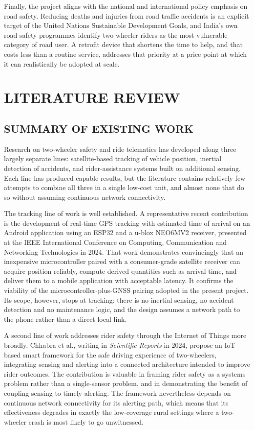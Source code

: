 \documentclass[12pt,a4paper,oneside]{report}
\begin{document}
Finally, the project aligns with the national and international policy emphasis on road
safety. Reducing deaths and injuries from road traffic accidents is an explicit target of
the United Nations Sustainable Development Goals, and India's own road-safety programmes
identify two-wheeler riders as the most vulnerable category of road user. A retrofit device
that shortens the time to help, and that costs less than a routine service, addresses that
priority at a price point at which it can realistically be adopted at scale.

\chapter{LITERATURE REVIEW}

\section{SUMMARY OF EXISTING WORK}

Research on two-wheeler safety and ride telematics has developed along three largely
separate lines: satellite-based tracking of vehicle position, inertial detection of
accidents, and rider-assistance systems built on additional sensing. Each line has produced
capable results, but the literature contains relatively few attempts to combine all three
in a single low-cost unit, and almost none that do so without assuming continuous network
connectivity.

The tracking line of work is well established. A representative recent contribution is the
development of real-time GPS tracking with estimated time of arrival on an Android
application using an ESP32 and a u-blox NEO6MV2 receiver, presented at the IEEE
International Conference on Computing, Communication and Networking Technologies in 2024.
That work demonstrates convincingly that an inexpensive microcontroller paired with a
consumer-grade satellite receiver can acquire position reliably, compute derived quantities
such as arrival time, and deliver them to a mobile application with acceptable latency. It
confirms the viability of the microcontroller-plus-GNSS pairing adopted in the present
project. Its scope, however, stops at tracking: there is no inertial sensing, no accident
detection and no maintenance logic, and the design assumes a network path to the phone
rather than a direct local link.

A second line of work addresses rider safety through the Internet of Things more broadly.
Chhabra et al., writing in \textit{Scientific Reports} in 2024, propose an IoT-based smart
framework for the safe driving experience of two-wheelers, integrating sensing and alerting
into a connected architecture intended to improve rider outcomes. The contribution is
valuable in framing rider safety as a systems problem rather than a single-sensor problem,
and in demonstrating the benefit of coupling sensing to timely alerting. The framework
nevertheless depends on continuous network connectivity for its alerting path, which means
that its effectiveness degrades in exactly the low-coverage rural settings where a
two-wheeler crash is most likely to go unwitnessed.
\end{document}
